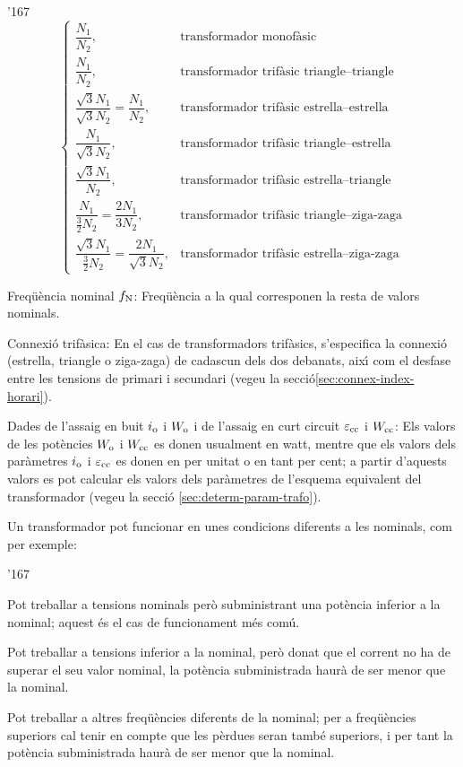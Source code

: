 \begin{dinglist}{'167}
\begin{equation}
\begin{cases}
        \dfrac{N_1}{N_2}, & \text{transformador monof\`{a}sic} \\[0.4cm]
        \dfrac{N_1}{N_2}, & \text{transformador trif\`{a}sic triangle--triangle} \\[0.4cm]
        \dfrac{\sqrt{3}N_1}{\sqrt{3}N_2} = \dfrac{N_1}{N_2}, & \text{transformador trif\`{a}sic estrella--estrella} \\[0.4cm]
        \dfrac{N_1}{\sqrt{3}N_2}, & \text{transformador trif\`{a}sic triangle--estrella} \\[0.4cm]
        \dfrac{\sqrt{3}N_1}{N_2}, & \text{transformador trif\`{a}sic estrella--triangle} \\[0.4cm]
        \dfrac{N_1}{\frac{3}{2}N_2} = \dfrac{2 N_1}{3 N_2}, & \text{transformador trif\`{a}sic triangle--ziga-zaga} \\[0.4cm]
        \dfrac{\sqrt{3}N_1}{\frac{3}{2}N_2} = \dfrac{2 N_1}{\sqrt{3} N_2}, & \text{transformador trif\`{a}sic estrella--ziga-zaga}
         \end{cases}
       \end{equation}
   \item Freq\"{u}\`{e}ncia nominal $f_\mathrm{N}$: Freq\"{u}\`{e}ncia a la qual corresponen la resta de valors nominals.
   \item Connexi\'{o} trif\`{a}sica: En el cas de transformadors trif\`{a}sics, s'especifica la connexi\'{o} (estrella, triangle o ziga-zaga) de cadascun dels dos debanats, aix\'{\i} com el desfase entre les tensions de primari i secundari (vegeu la secci\'{o}\vref{sec:connex-index-horari}).
   \item Dades de l'assaig en buit $i_\mathrm{o}$ i $W_\mathrm{o}$ i de l'assaig en curt circuit $\varepsilon_\mathrm{cc}$ i $W_\mathrm{cc}$: Els valors de les pot\`{e}ncies $W_\mathrm{o}$ i $W_\mathrm{cc}$ es donen
usualment en watt, mentre que els valors dels par\`{a}metres $i_\mathrm{o}$
i $\varepsilon_\mathrm{cc}$ es donen en per unitat o en tant per cent; a partir d'aquests valors es pot calcular els valors dels par\`{a}metres de l'esquema equivalent del transformador  (vegeu la secci\'{o} \vref{sec:determ-param-trafo}).
\end{dinglist}

Un transformador pot funcionar en unes condicions diferents a les nominals, com per exemple:
\begin{dinglist}{'167}
   \item Pot treballar a tensions nominals per\`{o} subministrant una pot\`{e}ncia inferior a la nominal; aquest \'{e}s el cas de funcionament m\'{e}s com\'{u}.
   \item Pot treballar a tensions inferior a la nominal, per\`{o} donat que el corrent no ha de superar el seu valor nominal, la pot\`{e}ncia subministrada haur\`{a} de ser menor que la nominal.
   \item Pot treballar a altres freq\"{u}\`{e}ncies diferents de la nominal; per a freq\"{u}\`{e}ncies superiors cal tenir en compte que les p\`{e}rdues seran tamb\'{e} superiors, i per tant la pot\`{e}ncia subministrada haur\`{a} de ser menor que la nominal.
\end{dinglist}

